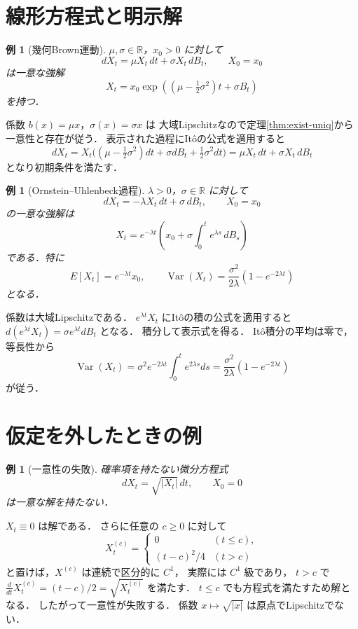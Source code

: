 \documentclass[a5paper,10pt,onecolumn]{jsarticle}
\makeatletter
\theoremstyle{mathnotetheorem}
\newtheorem{example}[theorem]{例}
\renewcommand{\proofname}{証明}
\renewenvironment{proof}[1][\proofname]{%
  \par\pushQED{\qed}\normalfont\topsep4\p@\@plus2\p@\relax
  \trivlist\item[\hskip\labelsep\bfseries #1]\ignorespaces
}{\popQED\endtrivlist\@endpefalse}
\makeatother
\begin{document}
\section{線形方程式と明示解}

\begin{example}[幾何Brown運動]\label{ex:gbm}
$\mu,\sigma\in\mathbb R$，$x_0>0$ に対して
\[
 dX_t=\mu X_t\,dt+\sigma X_t\,dB_t,\qquad X_0=x_0
\]
は一意な強解
\[
 X_t=x_0\exp\!\left(
 (\mu-\tfrac12\sigma^2)t+\sigma B_t\right)
\]
を持つ．
\end{example}
\begin{proof}
係数 $b(x)=\mu x$，$\sigma(x)=\sigma x$ は
大域Lipschitzなので定理\ref{thm:exist-uniq}から
一意性と存在が従う．
表示された過程にIt\^oの公式を適用すると
\[
 dX_t=X_t\bigl(
 (\mu-\tfrac12\sigma^2)dt+\sigma dB_t
 +\tfrac12\sigma^2dt\bigr)
 =\mu X_t\,dt+\sigma X_t\,dB_t
\]
となり初期条件を満たす．
\end{proof}

\begin{example}[Ornstein--Uhlenbeck過程]\label{ex:ou}
$\lambda>0$，$\sigma\in\mathbb R$ に対して
\[
 dX_t=-\lambda X_t\,dt+\sigma\,dB_t,\qquad X_0=x_0
\]
の一意な強解は
\[
 X_t=e^{-\lambda t}
  \left(x_0+\sigma\int_0^te^{\lambda s}\,dB_s\right)
\]
である．特に
\[
 E[X_t]=e^{-\lambda t}x_0,\qquad
 \operatorname{Var}(X_t)
 =\frac{\sigma^2}{2\lambda}(1-e^{-2\lambda t})
\]
となる．
\end{example}
\begin{proof}
係数は大域Lipschitzである．
$e^{\lambda t}X_t$ にIt\^oの積の公式を適用すると
$d(e^{\lambda t}X_t)=\sigma e^{\lambda t}dB_t$ となる．
積分して表示式を得る．
It\^o積分の平均は零で，等長性から
\[
 \operatorname{Var}(X_t)
 =\sigma^2e^{-2\lambda t}\int_0^te^{2\lambda s}ds
 =\frac{\sigma^2}{2\lambda}(1-e^{-2\lambda t})
\]
が従う．
\end{proof}

\section{仮定を外したときの例}

\begin{example}[一意性の失敗]
確率項を持たない微分方程式
\[
 dX_t=\sqrt{|X_t|}\,dt,\qquad X_0=0
\]
は一意な解を持たない．
\end{example}
\begin{proof}
$X_t\equiv0$ は解である．
さらに任意の $c\ge0$ に対して
\[
 X_t^{(c)}=
 \begin{cases}
 0&(t\le c),\\
 (t-c)^2/4&(t>c)
 \end{cases}
\]
と置けば，$X^{(c)}$ は連続で区分的に $C^1$，
実際には $C^1$ 級であり，
$t>c$ で
$\frac d{dt}X_t^{(c)}=(t-c)/2
=\sqrt{X_t^{(c)}}$ を満たす．
$t\le c$ でも方程式を満たすため解となる．
したがって一意性が失敗する．
係数 $x\mapsto\sqrt{|x|}$ は原点でLipschitzでない．
\end{proof}
\end{document}
